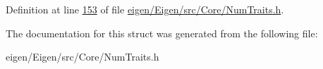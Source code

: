 Definition at line \hyperlink{eigen_2_eigen_2src_2_core_2_num_traits_8h_source_l00153}{153} of file \hyperlink{eigen_2_eigen_2src_2_core_2_num_traits_8h_source}{eigen/\+Eigen/src/\+Core/\+Num\+Traits.\+h}.



The documentation for this struct was generated from the following file\+:\begin{DoxyCompactItemize}
\item 
eigen/\+Eigen/src/\+Core/\+Num\+Traits.\+h\end{DoxyCompactItemize}
